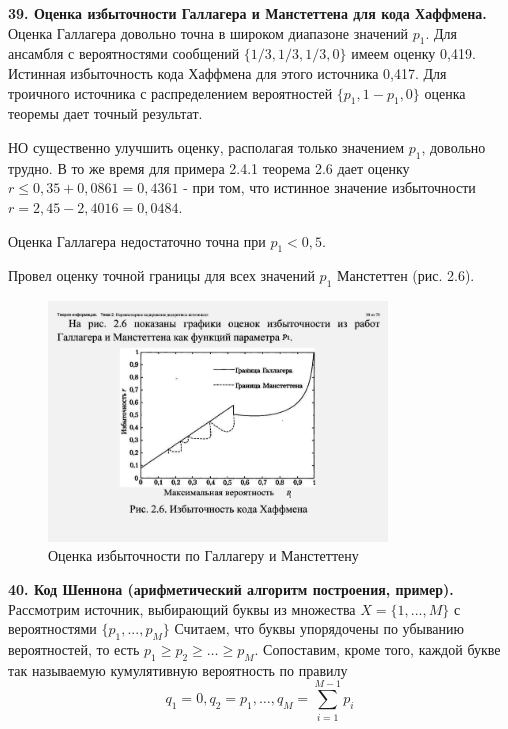 \documentclass[14pt]{article}
\begin{document}
\bigskip
\textbf{39. Оценка избыточности Галлагера и Манстеттена для кода Хаффмена.} \\

Оценка Галлагера довольно точна в широком диапазоне значений \(p_1\).
Для ансамбля с вероятностями сообщений \(\{1/3, 1/3, 1/3, 0\}\) имеем
оценку 0,419. Истинная избыточность кода Хаффмена для этого
источника 0,417. Для троичного источника с распределением
вероятностей \(\{p_1, 1 - p_1,0\}\) оценка теоремы дает точный результат.

НО существенно улучшить оценку, располагая только значением \(p_1\),
довольно трудно. В то же время для примера 2.4.1 теорема 2.6 дает
оценку \(r \leq 0,35 + 0,0861 = 0,4361\) - при том, что истинное значение
избыточности \(r = 2,45 - 2,4016 = 0,0484\).

Оценка Галлагера недостаточно точна при \(p_1 < 0,5\).

Провел оценку точной границы для всех значений \(p_1\) Манстеттен (рис. 2.6).

\begin{figure}[ht!]
\centering
    \includegraphics[width=90mm]{gallager_mark.png}
\caption{Оценка избыточности по Галлагеру и Манстеттену}
\end{figure}

\bigskip
\textbf{40. Код Шеннона (арифметический алгоритм построения, пример).} \\

Рассмотрим источник, выбирающий буквы из множества \(X = \{1,...,M\}\) с вероятностями \(\{p_1,...,p_M\}\) Считаем, что буквы упорядочены по убыванию вероятностей, то есть \(p_1 \geq p_2 \geq \ldots \geq p_M\). Сопоставим, кроме того, каждой букве так называемую кумулятивную вероятность по правилу
\begin{displaymath}
    q_1 = 0, q_2 = p_1, \ldots, q_M = \sum_{i=1}^{M-1} p_i
\end{displaymath}
\end{document}
